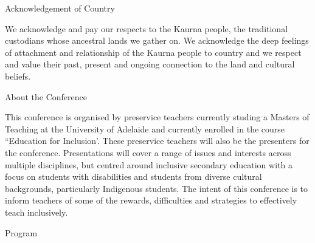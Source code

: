 \documentclass[twoside,14pt,a4paper,notitlepage]{memoir}
\newcounter{chapternonum}
\begin{document}
\pagestyle{plain}



\setcounter{tocdepth}{2}
\tableofcontents
\vfill

\pagebreak
\vspace*{2cm}
{\Huge Acknowledgement of Country}
\vspace{2cm}

We acknowledge and pay our respects to the Kaurna people, the traditional custodians whose ancestral lands we gather on. We acknowledge the deep feelings of attachment and relationship of the Kaurna people to country and we respect and value their past, present and ongoing connection to the land and cultural beliefs.
\vfill

\pagebreak
\vspace*{2cm}
{\Huge About the Conference}
\vspace{2cm}

This conference is organised by preservice teachers currently studing a Masters of Teaching at the University of Adelaide and currently enrolled in the course ``Education for Inclusion'. These preservice teachers will also be the presenters for the conference. Presentations will cover a range of issues and interests across multiple disciplines, but centred around inclusive secondary education with a focus on students with disabilities and students from diverse cultural backgrounds, particularly Indigenous students. The intent of this conference is to inform teachers of some of the rewards, difficulties and strategies to effectively teach inclusively. 
\vfill




%

\pagebreak
\vspace*{2cm}
{\Huge Program}
\vspace{2cm}
\end{document}
